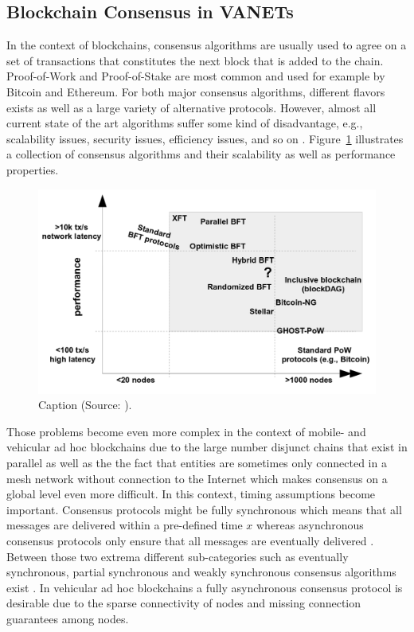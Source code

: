 \documentclass{llncs}
\begin{document}
{		%

		\subsection{Blockchain Consensus in VANETs}
			\label{ss:consensus}
			
			In the context of blockchains, consensus algorithms are usually used to agree on a set of transactions that constitutes the next block that is added to the chain. Proof-of-Work \cite{nakamoto_bitcoin:2008} and Proof-of-Stake \cite{bibid} are most common and used for example by Bitcoin and Ethereum. For both major consensus algorithms, different flavors exists as well as a large variety of alternative protocols. However, almost all current state of the art algorithms suffer some kind of disadvantage, e.g., scalability issues, security issues, efficiency issues, and so on \cite{bibid}\cite{bibid}. Figure~\ref{fig:bft-scalability} illustrates a collection of consensus algorithms and their scalability as well as performance properties. 
			\begin{figure}
				\centering
				\includegraphics[scale=0.25]{Figures/BFT/20180904_BFT-scalability.png}
				\caption{Caption (Source: \cite{vukolic2015quest}).}
				\label{fig:bft-scalability}
			\end{figure}
			Those problems become even more complex in the  context of mobile- and vehicular ad hoc blockchains due to the large number disjunct chains that exist in parallel as well as the the fact that entities are sometimes only connected in a mesh network without connection to the Internet which makes consensus on a global level even more difficult. In this context, timing assumptions become important. Consensus protocols might be fully synchronous which means that all messages are delivered within a pre-defined time  $x$ whereas asynchronous consensus protocols only ensure that all messages are eventually delivered \cite{bibid}. Between those two extrema different sub-categories such as eventually synchronous, partial synchronous and weakly synchronous consensus algorithms exist \cite{bibid}\cite{bibid}\cite{bibid}. In vehicular ad hoc blockchains a fully asynchronous consensus protocol is  desirable due to the sparse connectivity of nodes and missing connection guarantees among nodes.
						
}
\end{document}

